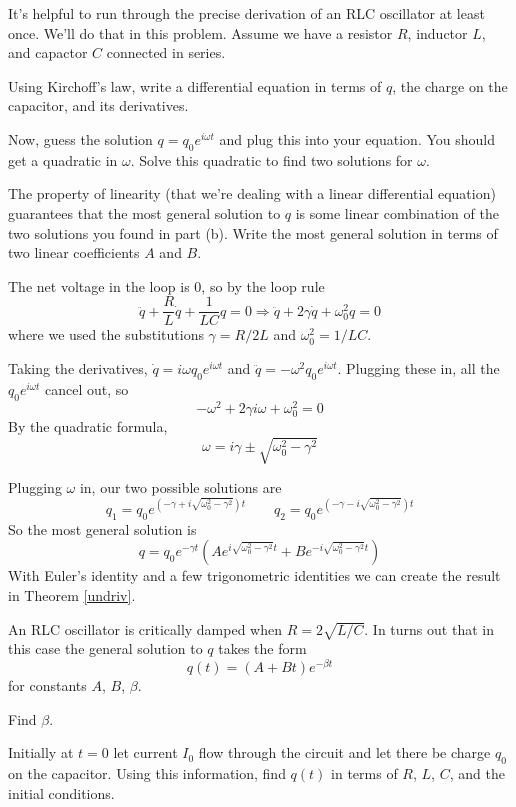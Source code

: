 \documentclass[11pt]{scrartcl}
\begin{document}
\begin{prob}\label{deriv}
    It's helpful to run through the precise derivation of an RLC oscillator at least once. We'll do that in this problem. Assume we have a resistor $R$, inductor $L$, and capactor $C$ connected in series. 
    \begin{anum}
        \item Using Kirchoff's law, write a differential equation in terms of $q$, the charge on the capacitor, and its derivatives. 
        \item Now, guess the solution $q=q_0e^{i\omega t}$ and plug this into your equation. You should get a quadratic in $\omega$. Solve this quadratic to find two solutions for $\omega$.
        \item The property of linearity (that we're dealing with a linear differential equation) guarantees that the most general solution to $q$ is some linear combination of the two solutions you found in part (b). Write the most general solution in terms of two linear coefficients $A$ and $B$.
    \end{anum}
\end{prob}

\begin{sol}
    \begin{anum}
        \item The net voltage in the loop is 0, so by the loop rule $$\boxed{\ddot q+\frac{R}{L}\dot q+\frac{1}{LC}q=0}\Rightarrow \ddot q+2\gamma \dot q+\omega_0^2 q=0$$where we used the substitutions $\gamma=R/2L$ and $\omega_0^2=1/LC$. 
        \item Taking the derivatives, $\dot q=i\omega q_0e^{i\omega t}$ and $\ddot q=-\omega^2q_0e^{i\omega t}$. Plugging these in, all the $q_0e^{i\omega t}$ cancel out, so $$-\omega^2+2\gamma i\omega +\omega_0^2=0$$By the quadratic formula, $$\omega=\boxed{i\gamma \pm \sqrt{\omega_0^2-\gamma^2}}$$
        \item Plugging $\omega$ in, our two possible solutions are $$q_1=q_0e^{(-\gamma+i\sqrt{\omega_0^2-\gamma^2})t}\qquad q_2=q_0e^{(-\gamma-i\sqrt{\omega_0^2-\gamma^2})t}$$So the most general solution is $$q=\boxed{q_0e^{-\gamma t}(Ae^{i\sqrt{\omega_0^2-\gamma^2}t}+Be^{-i\sqrt{\omega_0^2-\gamma^2}t})}$$With Euler's identity and a few trigonometric identities we can create the result in Theorem \ref{undriv}.
    \end{anum}
\end{sol}

\begin{prob}
    An RLC oscillator is critically damped when $R=2\sqrt{L/C}$. In turns out that in this case the general solution to $q$ takes the form $$q(t)=(A+Bt)e^{-\beta t}$$for constants $A$, $B$, $\beta$. \begin{anum}
        \item Find $\beta$.
        \item Initially at $t=0$ let current $I_0$ flow through the circuit and let there be charge $q_0$ on the capacitor. Using this information, find $q(t)$ in terms of $R$, $L$, $C$, and the initial conditions. 
    \end{anum} 
\end{prob}
\end{document}
